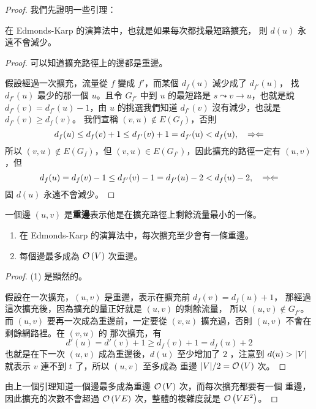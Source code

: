 \documentclass[a4paper,12pt]{book}
\begin{document}
\begin{proof}
我們先證明一些引理：
\begin{lemma}
  在 Edmonds-Karp 的演算法中，也就是如果每次都找最短路擴充，
  則 $d(u)$ 永遠不會減少。
\end{lemma}
\begin{proof}
  可以知道擴充路徑上的邊都是重邊。

  假設經過一次擴充，流量從 $f$ 變成 $f'$，而某個 $d_f(u)$ 減少成了 $d_{f'}(u)$，
  找 $d_{f'}(u)$ 最少的那一個 $u$。且令 $G_{f'}$ 中到 $u$ 的最短路是
  $s \leadsto v \rightarrow u$，也就是說 $d_{f'}(v) = d_{f'}(u) - 1$，由 $u$
  的挑選我們知道 $d_{f'}(v)$ 沒有減少，也就是 $d_{f'}(v) \geq d_f(v)$。
  我們宣稱 $(v, u) \notin E(G_f)$，否則
  \[ d_f(u) \leq d_f(v) + 1 \leq d_{f'}(v) + 1 = d_{f'}(u) < d_f(u), \quad \Rightarrow\hspace*{-1pt}\Leftarrow\]
  所以 $(v, u) \notin E(G_f)$，但 $(v, u) \in E(G_{f'})$，因此擴充的路徑一定有 $(u, v)$
  ，但
  \[ d_f(u) = d_f(v) - 1 \leq d_{f'}(v) - 1 = d_{f'}(u) - 2 < d_f(u) - 2, \quad \Rightarrow\hspace*{-1pt}\Leftarrow\]
    固 $d(u)$ 永遠不會減少。
\end{proof}
\clearpage
\begin{definition}
  一個邊 $(u, v)$ 是{\bf 重邊}表示他是在擴充路徑上剩餘流量最小的一條。
\end{definition}
\begin{lemma}
  \pass
  \begin{enumerate}
    \item 在 Edmonds-Karp 的演算法中，每次擴充至少會有一條重邊。
    \item 每個邊最多成為 $\operatorname{\mathcal{O}}\left(V\right)$ 次重邊。
  \end{enumerate}
\end{lemma}
\begin{proof} (1) 是顯然的。
  
  假設在一次擴充，$(u, v)$ 是重邊，表示在擴充前 $d_f(v) = d_f(u) + 1$，
  那經過這次擴充後，因為擴充的量正好就是 $(u, v)$ 的剩餘流量，
  所以 $(u, v) \notin G_{f'}$。而 $(u, v)$ 要再一次成為重邊前，一定要從
  $(v, u)$ 擴充過，否則 $(u, v)$ 不會在剩餘網路裡。在 $(v, u)$ 的
  那次擴充，有
  \[ d'(u) = d'(v) + 1 \geq d_f(v) + 1 = d_f(u) + 2 \]
  也就是在下一次 $(u, v)$ 成為重邊後，$d(u)$ 至少增加了 $2$ ，注意到
  $d(u) > \lvert V \rvert$ 就表示 $v$ 連不到 $t$ 了，所以 $(u, v)$ 至多成為
  重邊 $\lvert V \rvert / 2 = \operatorname{\mathcal{O}}\left(V\right)$ 次。
\end{proof}
由上一個引理知道一個邊最多成為重邊 $\operatorname{\mathcal{O}}\left(V\right)$ 次，而每次擴充都要有一個
重邊，因此擴充的次數不會超過 $\operatorname{\mathcal{O}}\left(VE\right)$ 次，整體的複雜度就是 $\operatorname{\mathcal{O}}\left(VE^2\right)$。
\end{proof}
\end{document}
